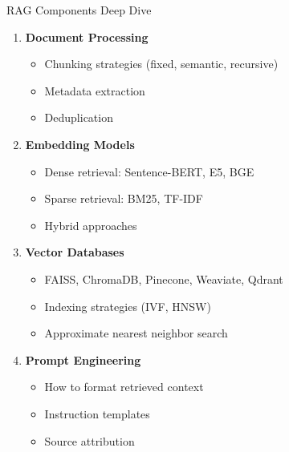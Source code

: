 \documentclass[aspectratio=169]{beamer}
\begin{document}
\begin{frame}[shrink=10]{RAG Components Deep Dive 🔬}
\begin{enumerate}\setlength{\itemsep}{0pt}
    \item \textbf{Document Processing}
    \begin{itemize}\setlength{\itemsep}{0pt}
        \item Chunking strategies (fixed, semantic, recursive)
        \item Metadata extraction
        \item Deduplication
    \end{itemize}

    \vspace{0.3em}

    \item \textbf{Embedding Models}
    \begin{itemize}\setlength{\itemsep}{0pt}
        \item Dense retrieval: Sentence-BERT, E5, BGE
        \item Sparse retrieval: BM25, TF-IDF
        \item Hybrid approaches
    \end{itemize}

    \vspace{0.3em}

    \item \textbf{Vector Databases}
    \begin{itemize}\setlength{\itemsep}{0pt}
        \item FAISS, ChromaDB, Pinecone, Weaviate, Qdrant
        \item Indexing strategies (IVF, HNSW)
        \item Approximate nearest neighbor search
    \end{itemize}

    \vspace{0.3em}

    \item \textbf{Prompt Engineering}
    \begin{itemize}\setlength{\itemsep}{0pt}
        \item How to format retrieved context
        \item Instruction templates
        \item Source attribution
    \end{itemize}
\end{enumerate}
\end{frame}
\end{document}
